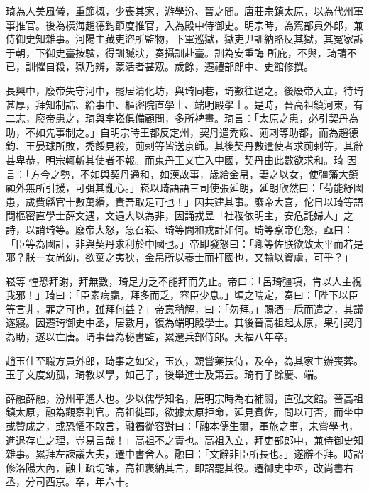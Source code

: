 \begin{pinyinscope}
 琦為人美風儀，重節概，少喪其家，游學汾、晉之間。唐莊宗鎮太原，以為代州軍事推官。後為橫海趙德鈞節度推官，入為殿中侍御史。明宗時，為駕部員外郎，兼侍御史知雜事。河陽主藏吏盜所監物，下軍巡獄，獄吏尹訓納賂反其獄，其冤家訴于朝，下御史臺按驗，得訓贓狀，奏攝訓赴臺。訓為安重誨
 所庇，不與，琦請不已，訓懼自殺，獄乃辨，蒙活者甚眾。歲餘，遷禮部郎中、史館修撰。



 長興中，廢帝失守河中，罷居清化坊，與琦同巷，琦數往過之。後廢帝入立，待琦甚厚，拜知制誥、給事中、樞密院直學士、端明殿學士。是時，晉高祖鎮河東，有二志，廢帝患之，琦與李崧俱備顧問，多所裨畫。琦言：「太原之患，必引契丹為助，不如先事制之。」自明宗時王都反定州，契丹遣禿餒、荝剌等助都，而為趙德鈞、王晏球所敗，禿餒見殺，荝剌等皆送京師。其後契丹數遣使者求荝剌等，其辭甚卑恭，明宗輒斬其使者不報。而東丹王又亡入中國，契丹由此數欲求和。琦
 因言：「方今之勢，不如與契丹通和，如漢故事，歲給金帛，妻之以女，使彊籓大鎮顧外無所引援，可弭其亂心。」崧以琦語語三司使張延朗，延朗欣然曰：「茍能紓國患，歲費縣官十數萬緡，責吾取足可也！」因共建其事。廢帝大喜，佗日以琦等語問樞密直學士薛文遇，文遇大以為非，因誦戎昱「社稷依明主，安危託婦人」之詩，以誚琦等。廢帝大怒，急召崧、琦等問和戎計如何。琦等察帝色怒，亟曰：「臣等為國計，非與契丹求利於中國也。」帝即發怒曰：「卿等佐朕欲致太平而若是邪？朕一女尚幼，欲棄之夷狄，金帛所以養士而扞國也，又輸以資虜，可乎？」



 崧等
 惶恐拜謝，拜無數，琦足力乏不能拜而先止。帝曰：「呂琦彊項，肯以人主視我邪！」琦曰：「臣素病羸，拜多而乏，容臣少息。」頃之喘定，奏曰：「陛下以臣等言非，罪之可也，雖拜何益？」帝意稍解，曰：「勿拜。」賜酒一卮而遣之，其議遂寢。因遷琦御史中丞，居數月，復為端明殿學士。其後晉高祖起太原，果引契丹為助，遂以亡唐。琦事晉為秘書監，累遷兵部侍郎。天福八年卒。



 趙玉仕至職方員外郎，琦事之如父，玉疾，親嘗藥扶侍，及卒，為其家主辦喪葬。玉子文度幼孤，琦教以學，如己子，後舉進士及第云。琦有子餘慶、端。



 薛融薛融，汾州平遙人也。少以儒學知名，唐明宗時為右補闕，直弘文館。晉高祖鎮太原，融為觀察判官。高祖徙鄆，欲據太原拒命，延見賓佐，問以可否，而坐中或贊成之，或恐懼不敢言，融獨從容對曰：「融本儒生爾，軍旅之事，未嘗學也，進退存亡之理，豈易言哉！」高祖不之責也。高祖入立，拜吏部郎中，兼侍御史知雜事。累拜左諫議大夫，遷中書舍人。融曰：「文辭非臣所長也。」遂辭不拜。時詔修洛陽大內，融上疏切諫，高祖褒納其言，即詔罷其役。遷御史中丞，改尚書右丞，分司西京。卒，年六十。




\end{pinyinscope}

